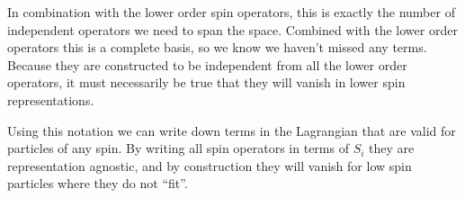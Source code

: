 In combination with the lower order spin operators, this is exactly the number of independent operators we need to span the space.  Combined with the lower order operators this is a complete basis, so we know we haven't missed any terms.  Because they are constructed to be independent from all the lower order operators, it must necessarily be true that they will vanish in lower spin representations.

Using this notation we can write down terms in the Lagrangian that are valid for particles of any spin.  By writing all spin operators in terms of $S_i$ they are representation agnostic, and by construction they will vanish for low spin particles where they do not ``fit''.